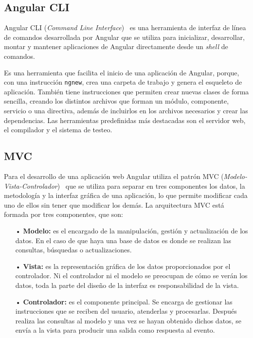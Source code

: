 \documentclass[a4paper, 12pt]{book}
\begin{document}
\subsection{Angular CLI}
\label{subsec:Angular CLI}

Angular CLI (\emph{Command Line Interface})~\cite{Pagina_de_angular_CLI} es una herramienta de interfaz de línea de comandos desarrollada por Angular que se utiliza para inicializar, desarrollar, montar y mantener aplicaciones de Angular directamente desde un \emph{shell} de comandos. 

Es una herramienta que facilita el inicio de una aplicación de Angular, porque, con una instrucción \texttt{ngnew}, crea una carpeta de trabajo y genera el esqueleto de aplicación. 
También tiene instrucciones que permiten crear nuevas clases de forma sencilla, creando los distintos archivos que forman un módulo, componente, servicio o una directiva, además de incluirlos en los archivos necesarios y crear las dependencias. 
Las herramientas predefinidas más destacadas son el servidor web, el compilador y el sistema de testeo.

\subsection{MVC}
\label{subsec:MVC}

Para el desarrollo de una aplicación web Angular utiliza el patrón MVC (\emph{Modelo-Vista-Controlador})~\cite{Pagina_MVC} que se utiliza para separar en tres componentes los datos, la metodología y la interfaz gráfica de una aplicación, lo que permite modificar cada uno de ellos sin tener que modificar los demás. 
La arquitectura MVC está formada por tres componentes, que son:
	\begin{itemize}
	\item[•] \textbf{Modelo:} es el encargado de la manipulación, gestión y actualización de los datos. 
	En el caso de que haya una base de datos es donde se realizan las consultas, búsquedas o actualizaciones.  
	
	\item[•] \textbf{Vista:} es la representación gráfica de los datos proporcionados por el controlador. 
	Ni el controlador ni el modelo se preocupan de cómo se verán los datos, toda la parte del diseño de la interfaz es responsabilidad de la vista.
	
	\item[•] \textbf{Controlador:} es el componente principal. Se encarga de gestionar las instrucciones que se reciben del usuario, atenderlas y procesarlas. 
	Después realiza las consultas al modelo y una vez se hayan obtenido dichos datos, se envía a la vista para producir una salida como respuesta al evento.
	\end{itemize}
	
\end{document}
